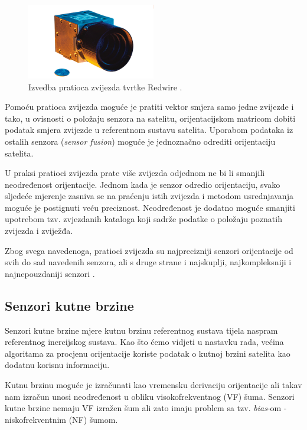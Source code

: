 \documentclass[times, utf8, diplomski, numeric]{templates/template}
\begin{document}
{{{{                \begin{figure}[htb]
                \centering
                \includegraphics[width=0.5\textwidth]{images/star_tracker.png}
                \caption{Izvedba pratioca zvijezda tvrtke Redwire \cite{starTrackerCite}.}
                \label{fig:star_tracker}
                \end{figure}

                Pomoću pratioca zvijezda moguće je pratiti vektor smjera samo jedne zvijezde i tako, u ovisnosti o položaju senzora na satelitu, orijentacijskom matricom dobiti podatak smjera zvijezde u referentnom sustavu satelita. Uporabom podataka iz ostalih senzora (\emph{sensor fusion}) moguće je jednoznačno odrediti orijentaciju satelita. 

                U praksi pratioci zvijezda prate više zvijezda odjednom ne bi li smanjili neodređenost orijentacije. Jednom kada je senzor odredio orijentaciju, svako sljedeće mjerenje zasniva se na praćenju istih zvijezda i metodom usrednjavanja moguće je postignuti veću preciznost. Neodređenost je dodatno moguće smanjiti upotrebom tzv. zvjezdanih kataloga \cite{starCatalogs} koji sadrže podatke o položaju poznatih zvijezda i zviježđa.

                Zbog svega navedenoga, pratioci zvijezda su najprecizniji senzori orijentacije od svih do sad navedenih senzora, ali s druge strane i najskuplji, najkompleksniji i najnepouzdaniji senzori \cite{adcsKnjiga}. 
            }
        }

        \subsection{Senzori kutne brzine}{
        \label{subsection:senzori_kutne_brzine}
            Senzori kutne brzine mjere kutnu brzinu referentnog sustava tijela naspram referentnog inercijskog sustava. Kao što ćemo vidjeti u nastavku rada, većina algoritama za procjenu orijentacije koriste podatak o kutnoj brzini satelita kao dodatnu korisnu informaciju. 

            Kutnu brzinu moguće je izračunati kao vremensku derivaciju orijentacije ali takav nam izračun unosi neodređenost u obliku visokofrekventnog (VF) šuma. Senzori kutne brzine nemaju VF izražen šum ali zato imaju problem sa tzv. \emph{bias}-om - niskofrekventnim (NF) šumom. 

}}}
\end{document}
